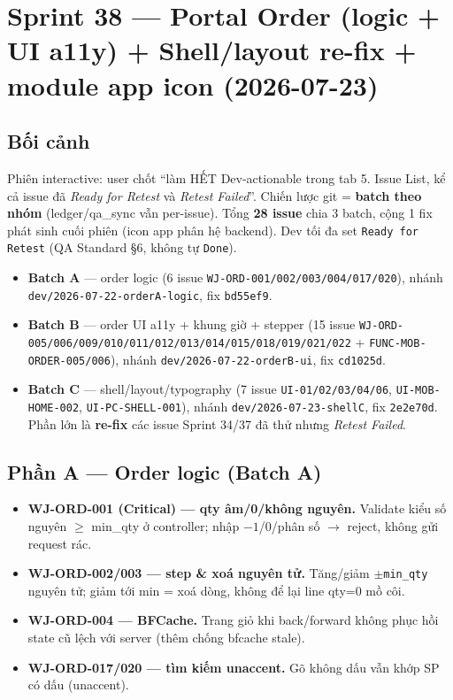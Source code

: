\chapter{Sprint 38 --- Portal Order (logic + UI a11y) + Shell/layout re-fix + module app icon (2026-07-23)}

\section{Bối cảnh}

Phiên interactive: user chốt ``làm HẾT Dev-actionable trong tab 5. Issue List, kể cả issue đã
\emph{Ready for Retest} và \emph{Retest Failed}''. Chiến lược git = \textbf{batch theo nhóm}
(ledger/qa\_sync vẫn per-issue). Tổng \textbf{28 issue} chia 3 batch, cộng 1 fix phát sinh cuối phiên
(icon app phân hệ backend). Dev tối đa set \texttt{Ready for Retest} (QA Standard §6, không tự
\texttt{Done}).

\begin{itemize}
  \item \textbf{Batch A} --- order logic (6 issue \texttt{WJ-ORD-001/002/003/004/017/020}), nhánh
    \texttt{dev/2026-07-22-orderA-logic}, fix \texttt{bd55ef9}.
  \item \textbf{Batch B} --- order UI a11y + khung giờ + stepper (15 issue
    \texttt{WJ-ORD-005/006/009/010/011/012/013/014/015/018/019/021/022} +
    \texttt{FUNC-MOB-ORDER-005/006}), nhánh \texttt{dev/2026-07-22-orderB-ui}, fix \texttt{cd1025d}.
  \item \textbf{Batch C} --- shell/layout/typography (7 issue \texttt{UI-01/02/03/04/06},
    \texttt{UI-MOB-HOME-002}, \texttt{UI-PC-SHELL-001}), nhánh \texttt{dev/2026-07-23-shellC}, fix
    \texttt{2e2e70d}. Phần lớn là \textbf{re-fix} các issue Sprint 34/37 đã thử nhưng
    \emph{Retest Failed}.
\end{itemize}

\section{Phần A --- Order logic (Batch A)}

\begin{itemize}
  \item \textbf{WJ-ORD-001 (Critical) --- qty âm/0/không nguyên.} Validate kiểu số nguyên
    $\geq$ min\_qty ở controller; nhập $-1$/$0$/phân số $\to$ reject, không gửi request rác.
  \item \textbf{WJ-ORD-002/003 --- step \& xoá nguyên tử.} Tăng/giảm $\pm$\texttt{min\_qty} nguyên tử;
    giảm tới min = xoá dòng, không để lại line qty=0 mồ côi.
  \item \textbf{WJ-ORD-004 --- BFCache.} Trang giỏ khi back/forward không phục hồi state cũ lệch với
    server (thêm chống bfcache stale).
  \item \textbf{WJ-ORD-017/020 --- tìm kiếm unaccent.} Gõ không dấu vẫn khớp SP có dấu (unaccent).
\end{itemize}

